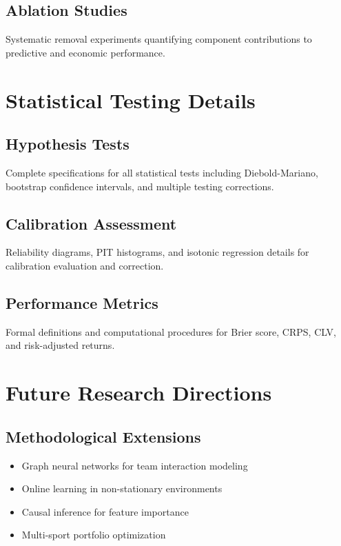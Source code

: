 \documentclass[12pt,letterpaper]{report}
\theoremstyle{definition}
\begin{document}
\section{Ablation Studies}
Systematic removal experiments quantifying component contributions to predictive and economic performance.

\chapter{Statistical Testing Details}

\section{Hypothesis Tests}
Complete specifications for all statistical tests including Diebold-Mariano, bootstrap confidence intervals, and multiple testing corrections.

\section{Calibration Assessment}
Reliability diagrams, PIT histograms, and isotonic regression details for calibration evaluation and correction.

\section{Performance Metrics}
Formal definitions and computational procedures for Brier score, CRPS, CLV, and risk-adjusted returns.

\chapter{Future Research Directions}

\section{Methodological Extensions}
\begin{itemize}
  \item Graph neural networks for team interaction modeling
  \item Online learning in non-stationary environments
  \item Causal inference for feature importance
  \item Multi-sport portfolio optimization
\end{itemize}
\end{document}
